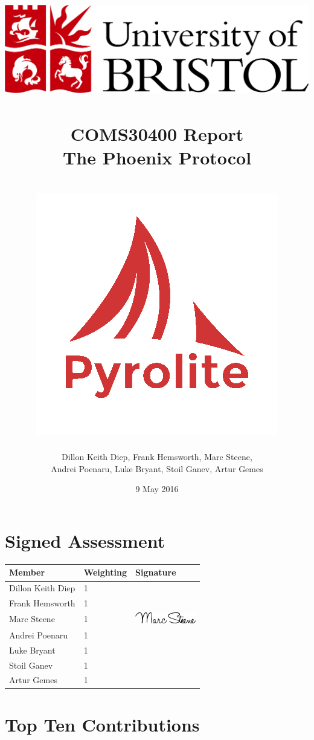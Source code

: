 \documentclass[a4paper,11pt]{article}
\title{
	\includegraphics[scale=0.4]{logos/bristollogo_colour}\\
	\horrule{0.4pt} \\[0.2cm]
	COMS30400 Report \\
    \Huge The Phoenix Protocol \\
    \horrule{0.4pt} \\[-0.5cm]
    \vspace{1.5cm}
	\includegraphics[scale=0.35]{images/pyrolite}
    \vspace{-.5cm}
}
\author{\Large Dillon Keith Diep, Frank Hemsworth, Marc Steene, \\ 
		\Large Andrei Poenaru, Luke Bryant, Stoil Ganev, Artur Gemes}
\date{\Large 9 May 2016}
\begin{document}
\maketitle

\clearpage

\section{Signed Assessment}

\vspace{2em}

\begin{table}[ht]
  \centering
  \Large
  \begin{tabular}{|M|M|M|}
      \hline
      Member			  & Weighting & Signature \\
      \hline\hline
      Dillon Keith Diep & 1 & \\
      \hline
      Frank Hemsworth   & 1 & \\
      \hline
      Marc Steene       & 1 & \includegraphics[width=.15\textwidth]{marc} \\
      \hline
      Andrei Poenaru    & 1 & \\
      \hline
      Luke Bryant       & 1 & \\
      \hline
      Stoil Ganev       & 1 & \\
      \hline
      Artur Gemes       & 1 & \\
      \hline
  \end{tabular}
\end{table}

\clearpage

\section{Top Ten Contributions}
\end{document}
